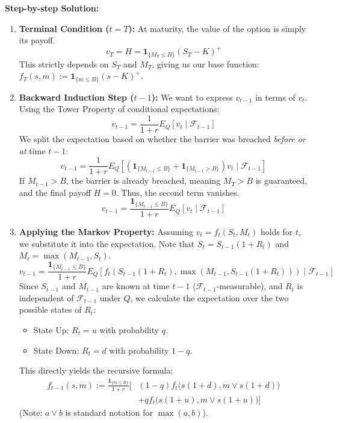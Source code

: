 \vspace{0.5cm}
\noindent \textbf{Step-by-step Solution:}
\begin{enumerate}
    \item \textbf{Terminal Condition ($t = T$):} At maturity, the value of the option is simply its payoff.
    \begin{equation*}
        v_T = H = \mathbf{1}_{\{M_T \le B\}}(S_T - K)^+
    \end{equation*}
    This strictly depends on $S_T$ and $M_T$, giving us our base function: $f_T(s, m) := \mathbf{1}_{\{m \le B\}}(s - K)^+$.
    
    \item \textbf{Backward Induction Step ($t-1$):} We want to express $v_{t-1}$ in terms of $v_t$. Using the Tower Property of conditional expectations:
    \begin{equation*}
        v_{t-1} = \frac{1}{1+r} E_Q[ v_t \mid \mathcal{F}_{t-1} ]
    \end{equation*}
    We split the expectation based on whether the barrier was breached \textit{before or at} time $t-1$:
    \begin{equation*}
        v_{t-1} = \frac{1}{1+r} E_Q[ (\mathbf{1}_{\{M_{t-1} \le B\}} + \mathbf{1}_{\{M_{t-1} > B\}}) v_t \mid \mathcal{F}_{t-1} ]
    \end{equation*}
    If $M_{t-1} > B$, the barrier is already breached, meaning $M_T > B$ is guaranteed, and the final payoff $H = 0$. Thus, the second term vanishes.
    \begin{equation*}
        v_{t-1} = \frac{\mathbf{1}_{\{M_{t-1} \le B\}}}{1+r} E_Q[ v_t \mid \mathcal{F}_{t-1} ]
    \end{equation*}
    
    \item \textbf{Applying the Markov Property:} Assuming $v_t = f_t(S_t, M_t)$ holds for $t$, we substitute it into the expectation. Note that $S_t = S_{t-1}(1+R_t)$ and $M_t = \max(M_{t-1}, S_t)$. 
    \begin{equation*}
        v_{t-1} = \frac{\mathbf{1}_{\{M_{t-1} \le B\}}}{1+r} E_Q[ f_t(S_{t-1}(1+R_t), \max(M_{t-1}, S_{t-1}(1+R_t))) \mid \mathcal{F}_{t-1} ]
    \end{equation*}
    Since $S_{t-1}$ and $M_{t-1}$ are known at time $t-1$ ($\mathcal{F}_{t-1}$-measurable), and $R_t$ is independent of $\mathcal{F}_{t-1}$ under $Q$, we calculate the expectation over the two possible states of $R_t$:
    \begin{itemize}
        \item State Up: $R_t = u$ with probability $q$.
        \item State Down: $R_t = d$ with probability $1-q$.
    \end{itemize}
    This directly yields the recursive formula:
    \begin{align*}
        f_{t-1}(s, m) := \frac{\mathbf{1}_{\{m \le B\}}}{1+r} \Big[ &(1-q) f_t\big(s(1+d), m \vee s(1+d)\big) \\
        &+ q f_t\big(s(1+u), m \vee s(1+u)\big) \Big]
    \end{align*}
    (Note: $a \vee b$ is standard notation for $\max(a, b)$).
\end{enumerate}

